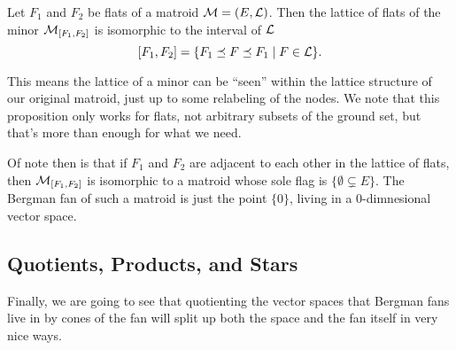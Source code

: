 \documentclass[12pt,oneside]{../../sfsuthesis}
\begin{document}
\begin{proposition}\th\label{thm:minorLattice}
    Let \( F_1 \) and \( F_2 \) be flats of a matroid \( \mathcal{M} = (E, \mathcal{L})\).
    Then the lattice of flats of the minor \( \mathcal{M}_{[F_1, F_2]} \) is isomorphic to the interval of \( \mathcal{L} \)
    \[
        [F_1, F_2] = \{ F_1 \preceq F \preceq F_1 \; | \; F \in \mathcal{L} \}.
    \]
\end{proposition}

This means the lattice of a minor can be ``seen'' within the lattice structure of our original matroid, just up to some relabeling of the nodes.
We note that this proposition only works for flats, not arbitrary subsets of the ground set, but that's more than enough for what we need.

Of note then is that if \( F_1 \) and \( F_2 \) are adjacent to each other in the lattice of flats, then \( \mathcal{M}_{[F_1, F_2]} \) is isomorphic to a matroid whose sole flag is \( \{ \emptyset \subsetneq E \} \).
The Bergman fan of such a matroid is just the point \( \{ 0 \} \), living in a \( 0 \)-dimnesional vector space.

\subsection{Quotients, Products, and Stars}

Finally, we are going to see that quotienting the vector spaces that Bergman fans live in by cones of the fan will split up both the space and the fan itself in very nice ways.
\end{document}
